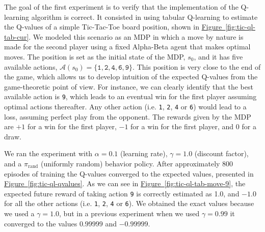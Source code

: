 \documentclass{article}
\begin{document}
The goal of the first experiment is to verify that the implementation of the Q-learning algorithm is
correct. It consisted in using tabular Q-learning to estimate the Q-values of a simple Tic-Tac-Toe
board position, shown in \hyperref[fig:tic-ql-tab-cur] {Figure~\ref*{fig:tic-ql-tab-cur}}. We
modeled this scenario as an MDP in which a move by nature is made for the second player using a
fixed Alpha-Beta agent that makes optimal moves. The position is set as the initial state of the
MDP, $s_0$, and it has five available actions, $\mathcal{A}(s_0) = \{\texttt{1}, \texttt{2},
\texttt{4}, \texttt{6}, \texttt{9}\}$. This position is very close to the end of the game, which
allows us to develop intuition of the expected Q-values from the game-theoretic point of view. For
instance, we can clearly identify that the best available action is \texttt{9}, which leads to an
eventual win for the first player assuming optimal actions thereafter. Any other action (i.e.
\texttt{1}, \texttt{2}, \texttt{4} or \texttt{6}) would lead to a loss, assuming perfect play from
the opponent.  The rewards given by the MDP are $+1$ for a win for the first player, $-1$ for a win
for the first player, and $0$ for a draw.

We ran the experiment with $\alpha = 0.1$ (learning rate), $\gamma=1.0$ (discount factor), and a
$\pi_{\textrm{rand}}$ (uniformly random) behavior policy.  After approximately 800 episodes of
training the Q-values converged to the expected values, presented in \hyperref[fig:tic-ql-qvalues]
{Figure~\ref*{fig:tic-ql-qvalues}}. As we can see in \hyperref[fig:tic-ql-tab-move-9]
{Figure~\ref*{fig:tic-ql-tab-move-9}}, the expected future reward of taking action \texttt{9} is
correctly estimated as 1.0, and $-1.0$ for all the other actions (i.e. \texttt{1}, \texttt{2},
\texttt{4} or \texttt{6}). We obtained the exact values because we used a $\gamma=1.0$, but in a
previous experiment when we used $\gamma=0.99$ it converged to the values $0.99999$ and $-0.99999$.


\end{document}
